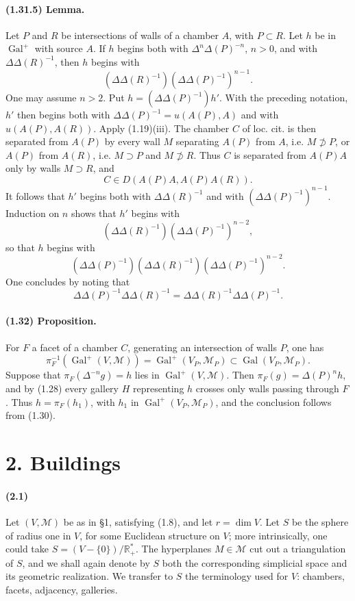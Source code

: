 \documentclass[10pt]{article}
\newcommand{\R}{\mathbb R}
\begin{document}
\paragraph{(1.31.5) Lemma.} Let \(P\) and \(R\) be intersections of walls of a chamber \(A\), with \(P\subset R\). Let \(h\) be in \(\operatorname{Gal}^+\) with source \(A\). If \(h\) begins both with \(\Delta^n\Delta(P)^{-n}\), \(n>0\), and with \(\Delta\Delta(R)^{-1}\), then \(h\) begins with
\[
(\Delta\Delta(R)^{-1})(\Delta\Delta(P)^{-1})^{n-1}.
\]
One may assume \(n>2\). Put \(h=(\Delta\Delta(P)^{-1})h'\). With the preceding notation, \(h'\) then begins both with \(\Delta\Delta(P)^{-1}=u(A(P),A)\) and with \(u(A(P),A(R))\). Apply (1.19)(iii). The chamber \(C\) of loc. cit. is then separated from \(A(P)\) by every wall \(M\) separating \(A(P)\) from \(A\), i.e. \(M\not\supset P\), or \(A(P)\) from \(A(R)\), i.e. \(M\supset P\) and \(M\not\supset R\). Thus \(C\) is separated from \(A(P)A\) only by walls \(M\supset R\), and
\[
C\in D(A(P)A,A(P)A(R)).
\]
It follows that \(h'\) begins both with \(\Delta\Delta(R)^{-1}\) and with \((\Delta\Delta(P)^{-1})^{n-1}\). Induction on \(n\) shows that \(h'\) begins with
\[
(\Delta\Delta(R)^{-1})(\Delta\Delta(P)^{-1})^{n-2},
\]
so that \(h\) begins with
\[
(\Delta\Delta(P)^{-1})(\Delta\Delta(R)^{-1})(\Delta\Delta(P)^{-1})^{n-2}.
\]
One concludes by noting that
\[
\Delta\Delta(P)^{-1}\Delta\Delta(R)^{-1}
=\Delta\Delta(R)^{-1}\Delta\Delta(P)^{-1}.
\]

\paragraph{(1.32) Proposition.} For \(F\) a facet of a chamber \(C\), generating an intersection of walls \(P\), one has
\[
\pi_F^{-1}(\operatorname{Gal}^+(V,\mathcal M))
=
\operatorname{Gal}^+(V_P,\mathcal M_P)\subset \operatorname{Gal}(V_P,\mathcal M_P).
\]
Suppose that \(\pi_F(\Delta^{-n}g)=h\) lies in \(\operatorname{Gal}^+(V,\mathcal M)\). Then \(\pi_F(g)=\Delta(P)^n h\), and by (1.28) every gallery \(H\) representing \(h\) crosses only walls passing through \(F\). Thus \(h=\pi_F(h_1)\), with \(h_1\) in \(\operatorname{Gal}^+(V_P,\mathcal M_P)\), and the conclusion follows from (1.30).

\section*{2. Buildings}

\paragraph{(2.1)} Let \((V,\mathcal M)\) be as in §1, satisfying (1.8), and let \(r=\dim V\). Let \(S\) be the sphere of radius one in \(V\), for some Euclidean structure on \(V\); more intrinsically, one could take \(S=(V-\{0\})/\R^*_+\). The hyperplanes \(M\in\mathcal M\) cut out a triangulation of \(S\), and we shall again denote by \(S\) both the corresponding simplicial space and its geometric realization. We transfer to \(S\) the terminology used for \(V\): chambers, facets, adjacency, galleries.
\end{document}
